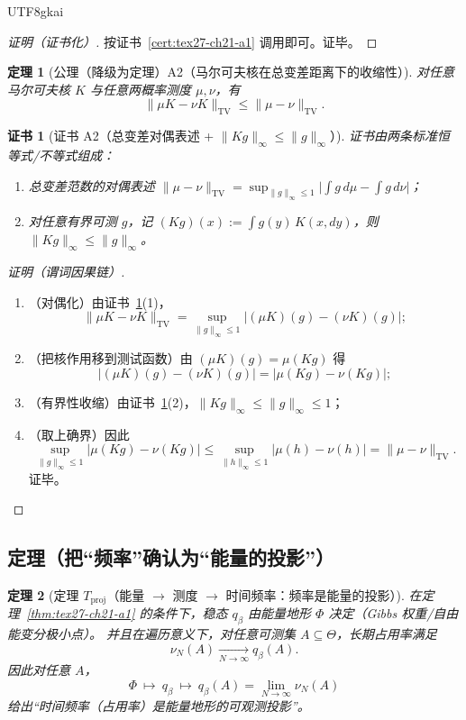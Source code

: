 \documentclass[12pt]{article}
\newtheorem{theorem}{定理}[section]
\newtheorem{Certificate}{证书}[section]
\begin{document}
\begin{CJK*}{UTF8}{gkai}
\begin{proof}[证明（证书化）]
按证书~\ref{cert:tex27-ch21-a1} 调用即可。证毕。
\end{proof}

\begin{theorem}[公理（降级为定理）A2（马尔可夫核在总变差距离下的收缩性）]
\label{thm:tex27-ch21-a2}
对任意马尔可夫核 $K$ 与任意两概率测度 $\mu,\nu$，有
\[
  \|\mu K-\nu K\|_{\mathrm{TV}}\le \|\mu-\nu\|_{\mathrm{TV}}.
\]
\end{theorem}

\begin{Certificate}[证书 A2（总变差对偶表述 + $\|Kg\|_\infty\le \|g\|_\infty$）]
\label{cert:tex27-ch21-a2}
证书由两条标准恒等式/不等式组成：
\begin{enumerate}
  \item 总变差范数的对偶表述
  $
    \|\mu-\nu\|_{\mathrm{TV}}
    =\sup_{\|g\|_\infty\le 1}\bigl|\int g\,d\mu-\int g\,d\nu\bigr|
  $；
  \item 对任意有界可测 $g$，记 $(Kg)(x):=\int g(y)\,K(x,dy)$，则 $\|Kg\|_\infty\le \|g\|_\infty$。
\end{enumerate}
\end{Certificate}

\begin{proof}[证明（谓词因果链）]
\begin{enumerate}
  \item（对偶化）由证书~\ref{cert:tex27-ch21-a2}(1)，
  \[
    \|\mu K-\nu K\|_{\mathrm{TV}}
    =\sup_{\|g\|_\infty\le 1}\bigl|(\mu K)(g)-(\nu K)(g)\bigr| ;
  \]
  \item（把核作用移到测试函数）由 $(\mu K)(g)=\mu(Kg)$ 得
  \[
    \bigl|(\mu K)(g)-(\nu K)(g)\bigr|=\bigl|\mu(Kg)-\nu(Kg)\bigr|;
  \]
  \item（有界性收缩）由证书~\ref{cert:tex27-ch21-a2}(2)，$\|Kg\|_\infty\le\|g\|_\infty\le 1$；
  \item（取上确界）因此
  \[
    \sup_{\|g\|_\infty\le 1}\bigl|\mu(Kg)-\nu(Kg)\bigr|
    \le \sup_{\|h\|_\infty\le 1}\bigl|\mu(h)-\nu(h)\bigr|
    =\|\mu-\nu\|_{\mathrm{TV}}.
  \]
  证毕。
\end{enumerate}
\end{proof}

\subsection{定理（把“频率”确认为“能量的投影”）}
\label{subsec:tex27-ch21-theorem}

\begin{theorem}[定理 $T_{\mathrm{proj}}$（能量 $\to$ 测度 $\to$ 时间频率：频率是能量的投影）]
\label{thm:tex27-ch21-tproj}
在定理~\ref{thm:tex27-ch21-a1} 的条件下，稳态 $q_\beta$ 由能量地形 $\Phi$ 决定（Gibbs 权重/自由能变分极小点）。
并且在遍历意义下，对任意可测集 $A\subseteq\Theta$，长期占用率满足
\[
  \nu_{N}(A)\xrightarrow[N\to\infty]{} q_\beta(A).
\]
因此对任意 $A$，
\[
  \Phi\ \mapsto\ q_\beta\ \mapsto\ q_\beta(A)=\lim_{N\to\infty}\nu_{N}(A)
\]
给出“时间频率（占用率）是能量地形的可观测投影”。
\end{theorem}


\end{CJK*}
\end{document}
